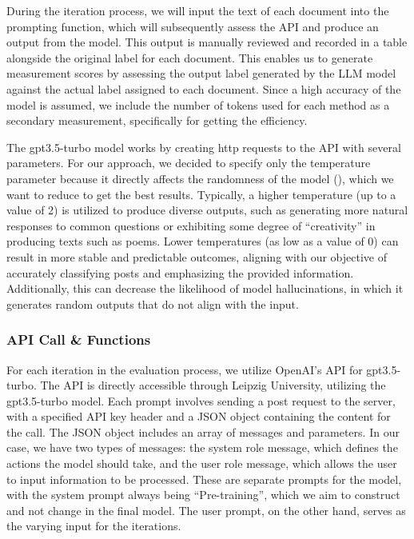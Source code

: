 \documentclass[english,bachelor]{swsLeipzig}
\begin{document}
During the iteration process, we will input the text of each document into the prompting function, which will 
subsequently assess the API and produce an output from the model. This output is manually reviewed and recorded in a table alongside the original label for each document. This enables us to generate measurement scores by assessing the output label generated by the LLM model against the actual label assigned to each document. Since a high accuracy of the model is assumed, we include the number of tokens used for each method as a secondary measurement, specifically for getting the efficiency.

The gpt3.5-turbo model works by creating http requests to the API with several parameters. For our approach, we 
decided to specify only the temperature parameter because it directly affects the randomness of the model (\citeauthor{openaicomplete:2023}), which we want to reduce to get the best results. Typically, a higher temperature (up to a value of 2) is utilized to produce diverse outputs, such as generating more natural responses to common questions or exhibiting some degree of ``creativity'' in producing texts such as poems. Lower temperatures (as low as a value of 0) can result in more stable and predictable outcomes, aligning with our objective of accurately classifying posts and emphasizing the provided information. Additionally, this can decrease the likelihood of model hallucinations, in which it generates random outputs that do not align with the input.

\subsubsection{API Call \& Functions}
For each iteration in the evaluation process, we utilize OpenAI's API for gpt3.5-turbo. The API is directly accessible 
through Leipzig University, utilizing the gpt3.5-turbo model. Each prompt involves sending a post request to the server, with a specified API key header and a JSON object containing the content for the call. The JSON object includes an array of messages and parameters. In our case, we have two types of messages: the system role message, which defines the actions the model should take, and the user role message, which allows the user to input information to be processed. These are separate prompts for the model, with the system prompt always being ``Pre-training'', which we aim to construct and not change in the final model. The user prompt, on the other hand, serves as the varying input for the iterations.
\end{document}
